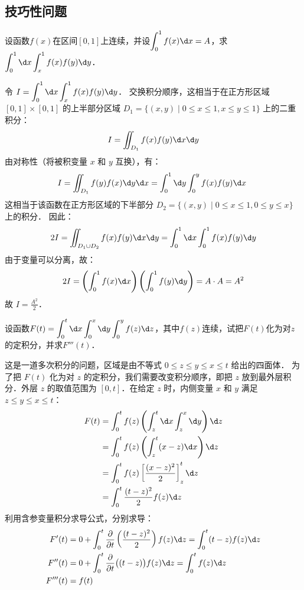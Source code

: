 \documentclass[12pt, a4paper, oneside, UTF8]{ctexbook}
\begin{document}
\subsection{技巧性问题}
\begin{exercise}
    设函数$f(x)$在区间$[0,1]$上连续，并设$\displaystyle\int_0^1 f(x) \d x = A$，求$\displaystyle\int_0^1 \d x \int_x^1 f(x)f(y) \d y$．
\end{exercise}
\begin{solution}
令 $I = \displaystyle\int_0^1 \d x \int_x^1 f(x)f(y) \d y$．
交换积分顺序，这相当于在正方形区域 $[0,1]\times[0,1]$ 的上半部分区域 $D_1 = \{(x,y) \mid 0 \le x \le 1, x \le y \le 1\}$ 上的二重积分：
\[ I = \iint_{D_1} f(x)f(y) \d x\d y \]
由对称性（将被积变量 $x$ 和 $y$ 互换），有：
\[ I = \iint_{D_1} f(y)f(x) \d y\d x = \int_0^1 \d y \int_0^y f(x)f(y) \d x\ \]
这相当于该函数在正方形区域的下半部分 $D_2 = \{(x,y) \mid 0 \le x \le 1, 0 \le y \le x\}$ 上的积分．
因此：
\[ 2I = \iint_{D_1\cup D_2} f(x)f(y) \d x\d y = \int_0^1 \d x \int_0^1 f(x)f(y) \d y \]
由于变量可以分离，故：
\[ 2I = \left(\int_0^1 f(x) \d x\right) \left(\int_0^1 f(y) \d y\right) = A \cdot A = A^2 \]
故 $\boxed{I = \frac{A^2}{2}}$．
\end{solution}

\begin{exercise}
    设函数$F(t)=\displaystyle\int_0^t\d x\int_0^x\d y\int_0^y f(z)\d z$，其中$f(z)$连续，试把$F(t)$化为对$z$的定积分，并求$F'''(t)$．
\end{exercise}
\begin{solution}
这是一道多次积分的问题，区域是由不等式 $0 \le z \le y \le x \le t$ 给出的四面体．
为了把 $F(t)$ 化为对 $z$ 的定积分，我们需要改变积分顺序，即把 $z$ 放到最外层积分．外层 $z$ 的取值范围为 $[0, t]$．在给定 $z$ 时，内侧变量 $x$ 和 $y$ 满足 $z \le y \le x \le t$：
\begin{align*}
F(t) &= \int_0^t f(z) \left( \int_z^t \d x \int_z^x \d y \right) \d z \\
     &= \int_0^t f(z) \left( \int_z^t (x - z) \d x \right) \d z \\
     &= \int_0^t f(z) \left[ \frac{(x-z)^2}{2} \right]_z^t \d z \\
     &= \int_0^t \frac{(t-z)^2}{2} f(z) \d z
\end{align*}
利用含参变量积分求导公式，分别求导：
\begin{align*}
F'(t) &= 0 + \int_0^t \frac{\partial}{\partial t}\left(\frac{(t-z)^2}{2}\right) f(z) \d z = \int_0^t (t-z)f(z) \d z \\
F''(t) &= 0 + \int_0^t \frac{\partial}{\partial t}\big((t-z)\big) f(z) \d z = \int_0^t f(z) \d z \\
F'''(t) &= f(t)
\end{align*}
\end{solution}
\end{document}
